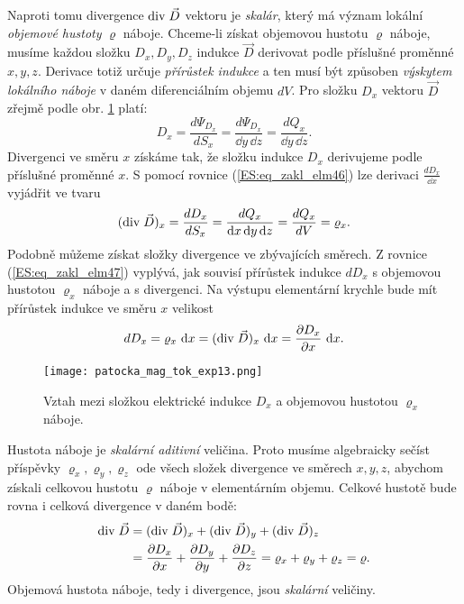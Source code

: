       Naproti tomu divergence \(\mathrm{div}\;\vec{D}\) vektoru je \emph{skalár}, který má význam lokální 
      \emph{objemové hustoty} \(\varrho\) náboje. Chceme-li získat objemovou hustotu \(\varrho\) 
      náboje, musíme každou složku \(D_x, D_y , D_z\) indukce \(\vec{D}\) derivovat podle příslušné 
      proměnné \(x, y, z\). Derivace totiž určuje \emph{přírůstek indukce} a ten musí být způsoben 
      \emph{výskytem lokálního náboje} v daném diferenciálním objemu \(dV\). Pro složku \(D_x\) 
      vektoru \(\vec{D}\) zřejmě podle obr. \ref{es:fig_patocka_mag_tok_exp13} platí:
      \begin{equation}\label{ES:eq_zakl_elm46}
        D_x = \frac{d\Psi_{D_x}}{dS_x} = \frac{d\Psi_{D_x}}{\dd{y}\,\dd{z}} = \frac{dQ_x}{\dd{y}\,\dd{z}}. 
      \end{equation} 
      Divergenci ve směru \(x\) získáme tak, že složku indukce \(D_x\) derivujeme podle příslušné 
      proměnné \(x\). S pomocí rovnice (\ref{ES:eq_zakl_elm46}) lze derivaci \(\frac{dD_x}{\dd{x}}\) 
      vyjádřit ve tvaru
      \begin{equation}\label{ES:eq_zakl_elm47}
        (\mathrm{div}\;\vec{D})_x = \frac{dD_x}{dS_x} = \frac{dQ_x}{\mathop{}\!\mathrm{d}x\mathop{}\!\mathrm{d}y\mathop{}\!\mathrm{d}z} = \frac{dQ_x}{dV} = \varrho_x. 
      \end{equation} 
      Podobně můžeme získat složky divergence ve zbývajících směrech. Z rovnice 
      (\ref{ES:eq_zakl_elm47}) vyplývá, jak souvisí přírůstek indukce \(dD_x\) s objemovou hustotou 
      \(\varrho_x\) náboje a s divergenci. Na výstupu elementární krychle bude mít přírůstek 
      indukce ve směru \(x\) velikost
      \begin{equation}\label{ES:eq_zakl_elm48}
        dD_x = \varrho_x\,\mathop{}\!\mathrm{d}x = (\mathrm{div}\;\vec{D})_x\,\mathop{}\!\mathrm{d}x = \dfrac{\partial D_x}{\partial x}\,\mathop{}\!\mathrm{d}x. 
      \end{equation} 
      \begin{figure}[ht!]
        \centering
        \texttt{[image: patocka\_mag\_tok\_exp13.png]}
        \caption{Vztah mezi složkou elektrické indukce \(D_x\) a objemovou hustotou \(\varrho_x\) 
                 náboje.}
        \label{es:fig_patocka_mag_tok_exp13}
      \end{figure}
      
      Hustota náboje je \emph{skalární aditivní} veličina. Proto musíme algebraicky sečíst 
      příspěvky \(\varrho_x, \varrho_y, \varrho_z\) ode všech složek divergence ve směrech \(x, y, 
      z\), abychom získali celkovou hustotu \(\varrho\) náboje v elementárním objemu. Celkové 
      hustotě bude rovna i celková divergence v daném bodě:
      \begin{align}\label{ES:eq_zakl_elm49}
        \mathrm{div}\;\vec{D} &= (\mathrm{div}\;\vec{D})_x + (\mathrm{div}\;\vec{D})_y + (\mathrm{div}\;\vec{D})_z  \nonumber \\
                  &= \dfrac{\partial D_x}{\partial x} + \dfrac{\partial D_y}{\partial y} + \dfrac{\partial D_z}{\partial z} =
                     \varrho_x + \varrho_y + \varrho_z = \varrho. 
      \end{align} 
      Objemová hustota náboje, tedy i divergence, jsou \emph{skalární} veličiny.
      
